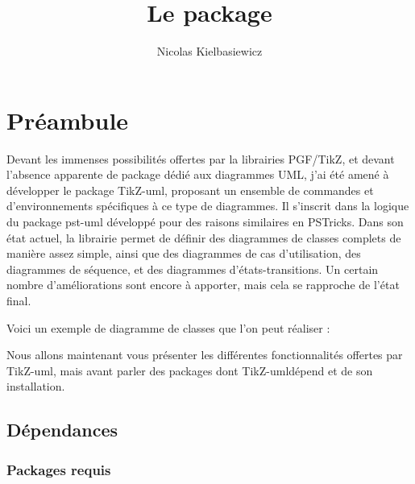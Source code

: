 \documentclass[a4paper,11pt]{report}
\title{Le package \tuml} %
\author{Nicolas {\sc Kielbasiewicz}} %
\newcommand{\inputTikZ}[1]{%
  }%
\newcommand{\inputTikZ}[1]{%
    \texttt{[image: fig/\#1.pdf]}%
  }%
\newcommand{\tuml}{{\sc TikZ-uml}}
\begin{document}
\maketitle

\tableofcontents

\chapter*{Préambule}

Devant les immenses possibilités offertes par la librairies {\sc PGF/TikZ}, et devant l'absence apparente de package dédié aux diagrammes UML, j'ai été amené à développer le package \tuml, proposant un ensemble de commandes et d'environnements spécifiques à ce type de diagrammes. Il s'inscrit dans la logique du package pst-uml développé pour des raisons similaires en {\sc PSTricks}. Dans son état actuel, la librairie permet de définir des diagrammes de classes complets de manière assez simple, ainsi que des diagrammes de cas d'utilisation, des diagrammes de séquence, et des diagrammes d'états-transitions. Un certain nombre d'améliorations sont encore à apporter, mais cela se rapproche de l'état final.

Voici un exemple de diagramme de classes que l'on peut réaliser :

\begin{center}
\inputTikZ{classdiagex}
\end{center}

Nous allons maintenant vous présenter les différentes fonctionnalités offertes par \tuml, mais avant parler des packages dont \tuml dépend et de son installation.

\section*{Dépendances}

\subsection*{Packages requis}
\end{document}
